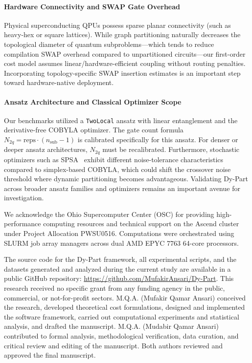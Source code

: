 \documentclass[pdflatex,sn-mathphys-num]{sn-jnl}
\theoremstyle{thmstyleone}
\theoremstyle{thmstyletwo}%
\theoremstyle{thmstylethree}%
\begin{document}
\paragraph{Hardware Connectivity and SWAP Gate Overhead} Physical superconducting QPUs possess sparse planar connectivity (such as heavy-hex or square lattices). While graph partitioning naturally decreases the topological diameter of quantum subproblems—which tends to reduce compilation SWAP overhead compared to unpartitioned circuits—our first-order cost model assumes linear/hardware-efficient coupling without routing penalties. Incorporating topology-specific SWAP insertion estimates is an important step toward hardware-native deployment.

\paragraph{Ansatz Architecture and Classical Optimizer Scope} Our benchmarks utilized a \texttt{TwoLocal} ansatz with linear entanglement and the derivative-free COBYLA optimizer. The gate count formula $N_{2q} = \text{reps} \cdot (n_{\text{sub}} - 1)$ is calibrated specifically for this ansatz. For denser or deeper ansatz architectures, $N_{2q}$ must be recalibrated. Furthermore, stochastic optimizers such as SPSA~\cite{Spall1992MultivariateSA} exhibit different noise-tolerance characteristics compared to simplex-based COBYLA, which could shift the crossover noise threshold where dynamic partitioning becomes advantageous. Validating Dy-Part across broader ansatz families and optimizers remains an important avenue for investigation.

 We acknowledge the Ohio Supercomputer Center (OSC) for providing high-performance computing resources and technical support on the Ascend cluster under Project Allocation PWSU0516. Computations were orchestrated using SLURM job array managers across dual AMD EPYC 7763 64-core processors.

 The source code for the Dy-Part framework, all experimental scripts, and the datasets generated and analyzed during the current study are available in a public GitHub repository: \url{https://github.com/MufakirAnsari/Dy-Part}.
 This research received no specific grant from any funding agency in the public, commercial, or not-for-profit sectors.
 M.Q.A. (Mufakir Qamar Ansari) conceived the research, developed theoretical cost formulations, designed and implemented the software framework, carried out computational experiments and statistical analysis, and drafted the manuscript. M.Q.A. (Mudabir Qamar Ansari) contributed to formal analysis, methodological verification, data curation, and critical review and editing of the manuscript. Both authors reviewed and approved the final manuscript.
\end{document}
